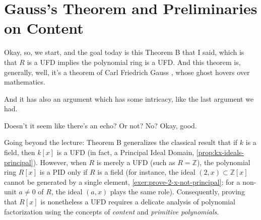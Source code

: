 \section{Gauss's Theorem and Preliminaries on Content}

\begin{speech}[00:00:00 - 00:00:41]
Okay, so, we start, and the goal today is this Theorem B that I said, which is that $R$ is a UFD implies the polynomial ring is a UFD.  And this theorem is, generally, well, it's a theorem of Carl Friedrich Gauss , whose ghost hovers over mathematics.

And it has also an argument which has some intricacy, like the last argument we had.

Doesn't it seem like there's an echo? Or not? No? Okay, good.
\end{speech}

\begin{content}
\end{content}

\begin{content}

\begin{steps}
Going beyond the lecture: Theorem B generalizes the classical result that if $k$ is a field, then $k[x]$ is a UFD (in fact, a Principal Ideal Domain, \cref{prop:kx-ideals-principal}). However, when $R$ is merely a UFD (such as $R = \mathbb{Z}$), the polynomial ring $R[x]$ is a PID only if $R$ is a field (for instance, the ideal $(2, x) \subset \mathbb{Z}[x]$ cannot be generated by a single element, \cref{exer:prove-2-x-not-principal}; for a non-unit $a \neq 0$ of $R$, the ideal $(a, x)$ plays the same role). Consequently, proving that $R[x]$ is nonetheless a UFD requires a delicate analysis of polynomial factorization using the concepts of \emph{content} and \emph{primitive polynomials}.
\end{steps}
\end{content}

